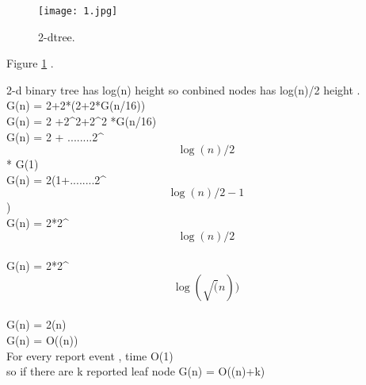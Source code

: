 \documentclass{article}
\begin{document}
\begin{figure}
  \texttt{[image: 1.jpg]}
  \caption{2-dtree.}
  \label{fig::2d_tree}
\end{figure}
Figure \ref{fig::2d_tree} .

2-d binary tree has log(n) height so conbined nodes has log(n)/2 height .\\

G(n) = 2+2*(2+2*G(n/16))\\
G(n) = 2 +2^2+2^2 *G(n/16)\\
G(n) = 2 + ........2^\[\log(n)/2\] * G(1)\\
G(n) = 2(1+........2^\[\log(n)/2-1\] ) \\
G(n) = 2*2^\[\log(n)/2\] \\
G(n) = 2*2^\[\log(\sqrt(n)) \]\\
G(n) = 2\sqrt(n) \\
G(n) = O(\sqrt(n))\\
 
For every report event , time O(1)\\
so if there are k reported leaf node G(n) = O(\sqrt(n)+k)\\
\end{document}
